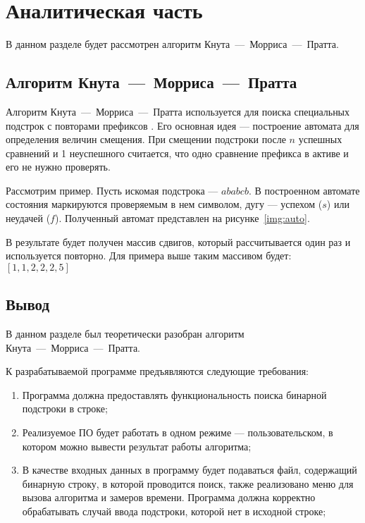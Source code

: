 \chapter{Аналитическая часть}
В данном разделе будет рассмотрен алгоритм Кнута~---~Морриса~---~Пратта. 

\section[Алгоритм Кнута~---~Морриса~---~Пратта]{Алгоритм Кнута~---~Морриса~---~Пратта}

Алгоритм Кнута~---~Морриса~---~Пратта используется для поиска специальных подстрок с повторами префиксов \cite{kmp}. Его основная идея --- построение автомата для определения величин смещения. При смещении подстроки после $n$ успешных сравнений и 1 неуспешного считается, что одно сравнение префикса в активе и его не нужно проверять.

Рассмотрим пример. Пусть искомая подстрока --- $ababcb$. В построенном автомате состояния маркируются проверяемым в нем символом, дугу --- успехом ($s$) или неудачей ($f$). Полученный автомат представлен на рисунке~\ref{img:auto}.


В результате будет получен массив сдвигов, который рассчитывается один раз и используется повторно. Для примера выше таким массивом будет:~$[1, 1, 2, 2, 2, 5]$

\section{Вывод}

В данном разделе был теоретически разобран алгоритм Кнута~---~Морриса~---~Пратта. 

К разрабатываемой программе предъявляются следующие требования:
\begin{enumerate}
	\item Программа должна предоставлять функциональность поиска бинарной подстроки в строке;
	
	\item Реализуемое ПО будет работать в одном режиме --- пользовательском, в котором можно вывести результат работы алгоритма;
	
	\item В качестве входных данных в программу будет подаваться файл, содержащий бинарную строку, в которой проводится поиск, также реализовано меню для вызова алгоритма и замеров времени. Программа должна корректно обрабатывать случай ввода подстроки, которой нет в исходной строке;
\end{enumerate}